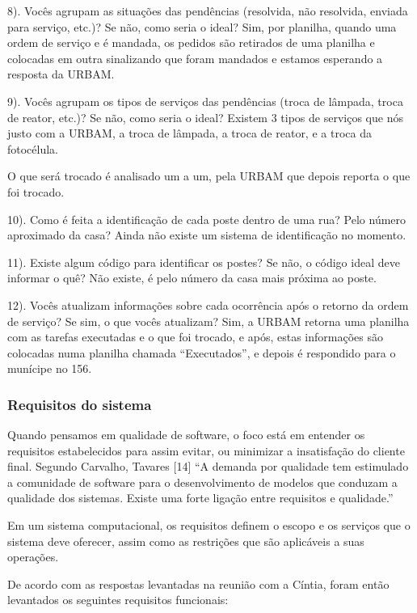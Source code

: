 \documentclass[
	article,			%
	11pt,				%
	oneside,			%
	a4paper,			%
	english,			%
	brazil,				%
	sumario=tradicional
	]{abntex2}
\begin{document}
8). Vocês agrupam as situações das pendências (resolvida, não resolvida,
enviada para serviço, etc.)? Se não, como seria o ideal?
Sim, por planilha, quando uma ordem de serviço e é mandada, os pedidos são
retirados de uma planilha e colocadas em outra sinalizando que foram mandados
e estamos esperando a resposta da URBAM.

9). Vocês agrupam os tipos de serviços das pendências (troca de lâmpada,
troca de reator, etc.)? Se não, como seria o ideal?
Existem 3 tipos de serviços que nós justo com a URBAM, a troca de lâmpada, a
troca de reator, e a troca da fotocélula.

O que será trocado é analisado um a um, pela URBAM que depois reporta o que
foi trocado.

10). Como é feita a identificação de cada poste dentro de uma rua? Pelo
número aproximado da casa?
Ainda não existe um sistema de identificação no momento.

11). Existe algum código para identificar os postes? Se não, o código ideal
deve informar o quê?
Não existe, é pelo número da casa mais próxima ao poste.

12). Vocês atualizam informações sobre cada ocorrência após o retorno da
ordem de serviço? Se sim, o que vocês atualizam?
Sim, a URBAM retorna uma planilha com as tarefas executadas e o que foi
trocado, e após, estas informações são colocadas numa planilha chamada
“Executados”, e depois é respondido para o munícipe no 156.


\subsubsection{Requisitos do sistema}

Quando pensamos em qualidade de software, o foco está em entender os requisitos
estabelecidos para assim evitar, ou minimizar a insatisfação do cliente final.
Segundo Carvalho, Tavares [14] “A demanda por qualidade tem estimulado a
comunidade de software para o desenvolvimento de modelos que conduzam a
qualidade dos sistemas. Existe uma forte ligação entre requisitos e qualidade.”

Em um sistema computacional, os requisitos definem o escopo e os serviços que o
sistema deve oferecer, assim como as restrições que são aplicáveis a suas
operações.

De acordo com as respostas levantadas na reunião com a Cíntia, foram então levantados os seguintes requisitos funcionais:
\end{document}
